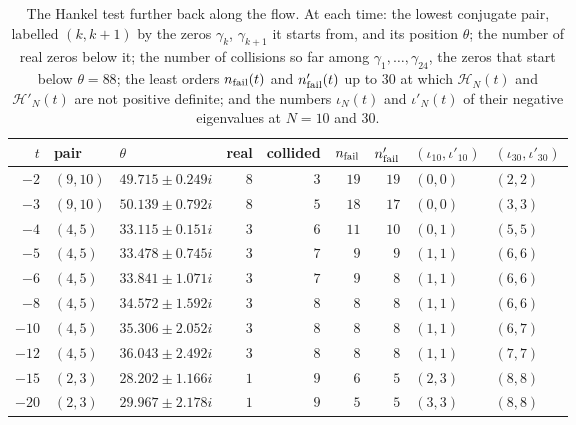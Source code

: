 \begin{table}[htbp]
\centering\small
\begin{tabular}{rllrrrrll}
\toprule
$t$ & pair & $\theta$ & real & collided & $n_{\rm fail}$ & $n'_{\rm fail}$ & $(\iota_{10},\iota'_{10})$ & $(\iota_{30},\iota'_{30})$\\
\midrule
$-2$ & $(9,10)$ & $49.715\pm0.249i$ & $8$ & $3$ & $19$ & $19$ & $(0,0)$ & $(2,2)$\\
$-3$ & $(9,10)$ & $50.139\pm0.792i$ & $8$ & $5$ & $18$ & $17$ & $(0,0)$ & $(3,3)$\\
$-4$ & $(4,5)$ & $33.115\pm0.151i$ & $3$ & $6$ & $11$ & $10$ & $(0,1)$ & $(5,5)$\\
$-5$ & $(4,5)$ & $33.478\pm0.745i$ & $3$ & $7$ & $9$ & $9$ & $(1,1)$ & $(6,6)$\\
$-6$ & $(4,5)$ & $33.841\pm1.071i$ & $3$ & $7$ & $9$ & $8$ & $(1,1)$ & $(6,6)$\\
$-8$ & $(4,5)$ & $34.572\pm1.592i$ & $3$ & $8$ & $8$ & $8$ & $(1,1)$ & $(6,6)$\\
$-10$ & $(4,5)$ & $35.306\pm2.052i$ & $3$ & $8$ & $8$ & $8$ & $(1,1)$ & $(6,7)$\\
$-12$ & $(4,5)$ & $36.043\pm2.492i$ & $3$ & $8$ & $8$ & $8$ & $(1,1)$ & $(7,7)$\\
$-15$ & $(2,3)$ & $28.202\pm1.166i$ & $1$ & $9$ & $6$ & $5$ & $(2,3)$ & $(8,8)$\\
$-20$ & $(2,3)$ & $29.967\pm2.178i$ & $1$ & $9$ & $5$ & $5$ & $(3,3)$ & $(8,8)$\\
\bottomrule
\end{tabular}
\caption{The Hankel test further back along the flow. At each time: the lowest conjugate pair, labelled $(k,k+1)$ by the zeros $\gamma_k$, $\gamma_{k+1}$ it starts from, and its position $\theta$; the number of real zeros below it; the number of collisions so far among $\gamma_1,\dots,\gamma_{24}$, the zeros that start below $\theta=88$; the least orders $n_{\rm fail}(t)$ and $n'_{\rm fail}(t)$ up to $30$ at which $\mathcal H_N(t)$ and $\mathcal H'_N(t)$ are not positive definite; and the numbers $\iota_N(t)$ and $\iota'_N(t)$ of their negative eigenvalues at $N=10$ and $30$.}
\label{tab:ch21:nfaillong}
\end{table}

